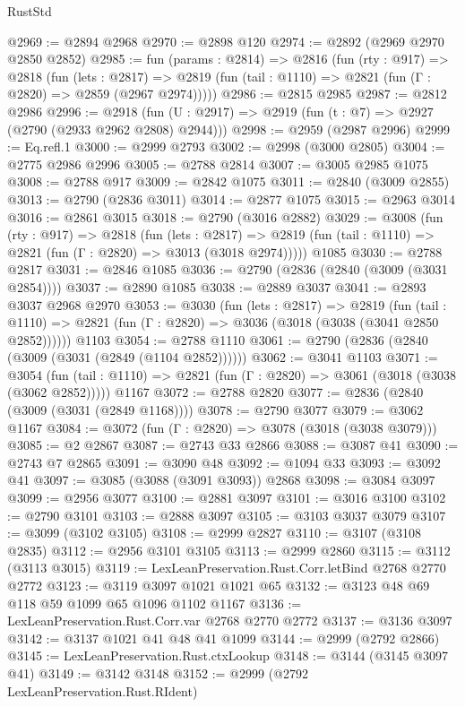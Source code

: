 \begin{lexlean}{RustStd}
\begin{coremodule}
{\begin{coremodule}
{{{{{{{{{{{{{{{{{{{{{{{{{{@2969 := @2894 @2968
@2970 := @2898 @120
@2974 := @2892 (@2969 @2970 @2850 @2852)
@2985 := fun (params : @2814) =>
  @2816
    (fun (rty : @917) =>
    @2818
      (fun (lets : @2817) =>
      @2819 (fun (tail : @1110) => @2821 (fun (Γ : @2820) => @2859 (@2967 @2974)))))
@2986 := @2815 @2985
@2987 := @2812 @2986
@2996 := @2918 (fun (U : @2917) => @2919 (fun (t : @7) => @2927 (@2790 (@2933 @2962 @2808) @2944)))
@2998 := @2959 (@2987 @2996)
@2999 := Eq.refl.{1}
@3000 := @2999 @2793
@3002 := @2998 (@3000 @2805)
@3004 := @2775 @2986 @2996
@3005 := @2788 @2814
@3007 := @3005 @2985 @1075
@3008 := @2788 @917
@3009 := @2842 @1075
@3011 := @2840 (@3009 @2855)
@3013 := @2790 (@2836 @3011)
@3014 := @2877 @1075
@3015 := @2963 @3014
@3016 := @2861 @3015
@3018 := @2790 (@3016 @2882)
@3029 := @3008
    (fun (rty : @917) =>
    @2818
      (fun (lets : @2817) =>
      @2819 (fun (tail : @1110) => @2821 (fun (Γ : @2820) => @3013 (@3018 @2974)))))
    @1085
@3030 := @2788 @2817
@3031 := @2846 @1085
@3036 := @2790 (@2836 (@2840 (@3009 (@3031 @2854))))
@3037 := @2890 @1085
@3038 := @2889 @3037
@3041 := @2893 @3037 @2968 @2970
@3053 := @3030
    (fun (lets : @2817) =>
    @2819
      (fun (tail : @1110) => @2821 (fun (Γ : @2820) => @3036 (@3018 (@3038 (@3041 @2850 @2852))))))
    @1103
@3054 := @2788 @1110
@3061 := @2790 (@2836 (@2840 (@3009 (@3031 (@2849 (@1104 @2852))))))
@3062 := @3041 @1103
@3071 := @3054
    (fun (tail : @1110) => @2821 (fun (Γ : @2820) => @3061 (@3018 (@3038 (@3062 @2852)))))
    @1167
@3072 := @2788 @2820
@3077 := @2836 (@2840 (@3009 (@3031 (@2849 @1168))))
@3078 := @2790 @3077
@3079 := @3062 @1167
@3084 := @3072 (fun (Γ : @2820) => @3078 (@3018 (@3038 @3079)))
@3085 := @2 @2867
@3087 := @2743 @33 @2866
@3088 := @3087 @41
@3090 := @2743 @7 @2865
@3091 := @3090 @48
@3092 := @1094 @33
@3093 := @3092 @41
@3097 := @3085 (@3088 (@3091 @3093)) @2868
@3098 := @3084 @3097
@3099 := @2956 @3077
@3100 := @2881 @3097
@3101 := @3016 @3100
@3102 := @2790 @3101
@3103 := @2888 @3097
@3105 := @3103 @3037 @3079
@3107 := @3099 (@3102 @3105)
@3108 := @2999 @2827
@3110 := @3107 (@3108 @2835)
@3112 := @2956 @3101 @3105
@3113 := @2999 @2860
@3115 := @3112 (@3113 @3015)
@3119 := LexLeanPreservation.Rust.Corr.letBind @2768 @2770 @2772
@3123 := @3119 @3097 @1021 @1021 @65
@3132 := @3123 @48 @69 @118 @59 @1099 @65 @1096 @1102 @1167
@3136 := LexLeanPreservation.Rust.Corr.var @2768 @2770 @2772
@3137 := @3136 @3097
@3142 := @3137 @1021 @41 @48 @41 @1099
@3144 := @2999 (@2792 @2866)
@3145 := LexLeanPreservation.Rust.ctxLookup
@3148 := @3144 (@3145 @3097 @41)
@3149 := @3142 @3148
@3152 := @2999 (@2792 LexLeanPreservation.Rust.RIdent)
}}}}}}}}}}}}}}}}}}}}}}}}}}
\end{coremodule}}
\end{coremodule}
\end{lexlean}
